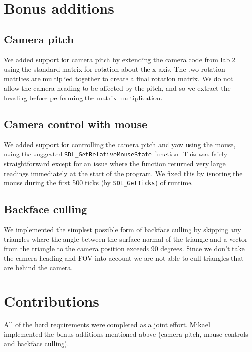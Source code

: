 \documentclass[a4paper,11pt]{article}
\begin{document}
\section*{Bonus additions}
\subsection*{Camera pitch}
We added support for camera pitch by extending the camera code from lab 2 using the standard
matrix for rotation about the x-axis. The two rotation matrices are multiplied together to create a
final rotation matrix. We do not allow the camera heading to be affected by the pitch, and so we extract
the heading before performing the matrix multiplication.

\subsection*{Camera control with mouse}
We added support for controlling the camera pitch and yaw using the mouse, using the suggested
\texttt{SDL\_GetRelativeMouseState} function. This was fairly straightforward except for an issue
where the function returned very large readings immediately at the start of the program. We fixed this
by ignoring the mouse during the first 500 ticks (by \texttt{SDL\_GetTicks}) of runtime.

\subsection*{Backface culling}
We implemented the simplest possible form of backface culling by skipping any triangles
where the angle between the surface normal of the triangle and a vector from the triangle
to the camera position exceeds 90 degrees. Since we don't take the camera heading and FOV
into account we are not able to cull triangles that are behind the camera.

\section*{Contributions}
All of the hard requirements were completed as a joint effort. Mikael implemented the bonus
additions mentioned above (camera pitch, mouse controls and backface culling).
\end{document}
